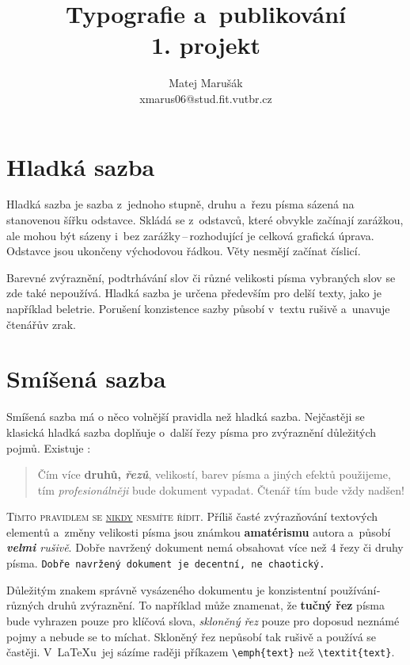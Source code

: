 \documentclass[a4paper, 11pt, twocolumn] {article}
\begin{document}
\title{Typografie a~publikování \\ 1. projekt}
\author{Matej Marušák \\ xmarus06@stud.fit.vutbr.cz}
\date{}

\maketitle


\section{Hladká sazba}
Hladká sazba je sazba z~jednoho stupně, druhu a~řezu pí­sma sázená na stanovenou šířku odstavce.
Skládá se z~odstavců, které obvykle začínají­ zarážkou, ale mohou být sázeny i~bez zarážky\,--\,rozhodují­cí­ je celková grafická úprava. Odstavce jsou ukončeny východovou řádkou. Věty nesmějí začínat číslicí.

Barevné zvýraznění­, podtrhávání­ slov či různé velikosti písma vybraných slov se zde také nepoužívá. Hladká sazba je určena především pro delší­ texty, jako je napří­klad beletrie. Porušení konzistence sazby působí v~textu rušivě a~unavuje čtenářův zrak.

\section{Smíšená sazba} 

Smíšená sazba má o něco volnější­ pravidla než hladká sazba. Nejčastěji se klasická hladká sazba doplňuje o~další řezy pí­sma pro zvýraznění­ důležitých pojmů. Existuje :
\begin{quotation}
Čí­m ví­ce \textbf{druhů, \emph{řezů}},  {\scriptsize velikostí}, barev pí­sma a jiných efektů použijeme, tí­m {\small \emph{profesionálněji}} bude  dokument vypadat. Čtenář tím bude vždy {\Huge nadšen!}
\end{quotation}



\textsc{Tí­mto pravidlem se \underline{nikdy} nesmí­te ří­dit}. Příliš časté zvýrazňování textových elementů  a~změny velikosti {\tiny pí­sma} jsou {\LARGE známkou} \textbf{{\huge a\-ma\-tér\-is\-mu}} autora a~působí­ \emph{\textbf{velmi} rušivě}. Dobře na\-vr\-že\-ný dokument nemá obsahovat ví­ce než 4 řezy či druhy pí­sma. \texttt{Dobře navržený dokument je decentní­, ne chaotický.}

Důležitým znakem správně vysázeného dokumentu je konzistentní použí­vání­ různých druhů zvýraznění­.
To napří­klad může znamenat, že \textbf{tučný řez} pí­sma bude vyhrazen pouze pro klíčová slova,
\emph{skloněný řez} pouze pro doposud neznámé pojmy a nebude se to míchat. Skloněný řez nepůsobí­
tak rušivě a použí­vá se častěji. V~\LaTeX u\ jej sází­me raději pří­kazem \verb|\emph{text}| než
\verb|\textit{text}|.
\end{document}
